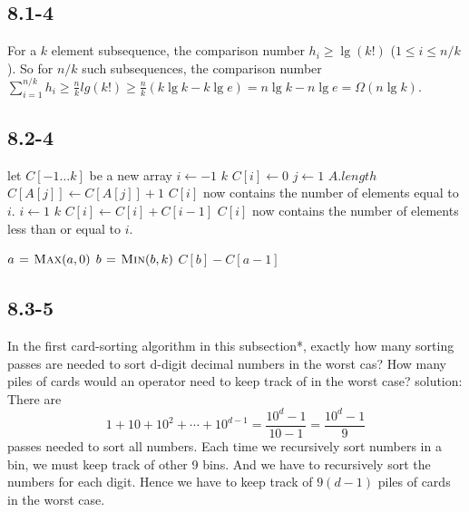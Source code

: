 \documentclass{book}
\begin{document}
\begin{CJK}{UTF8}{gkai}
\subsection*{8.1-4}
For a $k$ element subsequence, the comparison number $h_i \ge \lg(k!)$ ($1 \le i 
\le n/k$).  So for $n/k$ such subsequences, the comparison number 
$\sum_{i=1}^{n/k}h_i \ge \frac{n}{k}lg(k!) \ge \frac{n}{k}(k\lg k - k\lg e) = 
n\lg k - n\lg e = \Omega(n\lg k)$.

\subsection*{8.2-4}
\begin{codebox}
\li let $C[-1\dots k]$ be a new array
\li \For $i \gets -1$ \To $k$
\li \Do $C[i] \gets 0$
\End
\li \For $j \gets 1$ \To $A.length$
\li \Do $C[A[j]] \gets C[A[j]]+1$
\End
\li \Comment $C[i]$ now contains the number of elements equal to $i$.
\li \For $i \gets 1$ \To $k$
\li \Do $C[i] \gets C[i] + C[i-1]$
\End
\li \Comment $C[i]$ now contains the number of elements less than or equal to 
$i$.
\end{codebox}

\begin{codebox}
\li $a \mathrel{\hspace{1pt}=\hspace{1pt}} \textnormal{\scshape Max}(a, 0)$
\li $b \mathrel{\hspace{1pt}=\hspace{1pt}} \textnormal{\scshape Min}(b, k)$
\li \Return $C[b] - C[a-1]$
\end{codebox}

\subsection*{8.3-5}
In the first card-sorting algorithm in this subsection*, exactly how many sorting passes are needed to sort d-digit decimal numbers in the worst cas? How many piles of cards would an operator need to keep track of in the worst case?
solution:
There are $$1 + 10 + 10^2 + \cdots +10^{d-1} = \frac{10^d - 1}{10 - 1} = \frac{10^d - 1}{9}$$ passes needed to sort all numbers.
Each time we recursively sort numbers in a bin, we must keep track of other 9 
bins. And we have to recursively sort the numbers for each digit. Hence we have 
to keep track of $9(d-1)$ piles of cards in the worst case.


\end{CJK}
\end{document}
